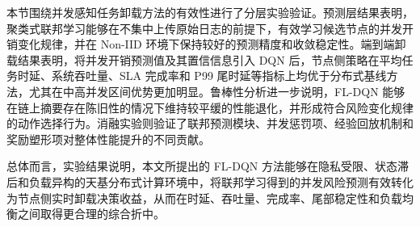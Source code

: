 本节围绕并发感知任务卸载方法的有效性进行了分层实验验证。预测层结果表明，聚类式联邦学习能够在不集中上传原始日志的前提下，有效学习候选节点的并发开销变化规律，并在 Non-IID 环境下保持较好的预测精度和收敛稳定性。端到端卸载结果表明，将并发开销预测值及其置信信息引入 DQN 后，节点侧策略在平均任务时延、系统吞吐量、SLA 完成率和 P99 尾时延等指标上均优于分布式基线方法，尤其在中高并发区间优势更加明显。鲁棒性分析进一步说明，FL-DQN 能够在链上摘要存在陈旧性的情况下维持较平缓的性能退化，并形成符合风险变化规律的动作选择行为。消融实验则验证了联邦预测模块、并发惩罚项、经验回放机制和奖励塑形项对整体性能提升的不同贡献。

总体而言，实验结果说明，本文所提出的 FL-DQN 方法能够在隐私受限、状态滞后和负载异构的天基分布式计算环境中，将联邦学习得到的并发风险预测有效转化为节点侧实时卸载决策收益，从而在时延、吞吐量、完成率、尾部稳定性和负载均衡之间取得更合理的综合折中。
